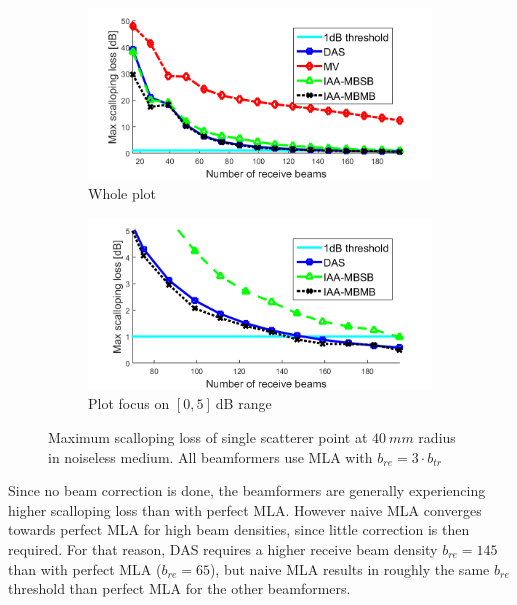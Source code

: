 \begin{figure}[ht]
    \centering
    \begin{subfigure}[t]{\linewidth}
        \includegraphics[width=\linewidth]{./images/results/4/loss_vs_beams_mla.png}
        \caption{Whole plot}
    \end{subfigure}
    \quad
    \begin{subfigure}[t]{\linewidth}
        \includegraphics[width=\linewidth]{./images/results/4/loss_vs_beams_mla_zoom.png}
        \caption{Plot focus on $[0, 5]~$dB range}
    \end{subfigure}
	\caption{Maximum scalloping loss of single scatterer point at $40~mm$ radius in noiseless medium. All beamformers use MLA with $b_{re} = 3 \cdot b_{tr}$}
	\label{fig:loss_vs_beams_mla}
\end{figure}

Since no beam correction is done, the beamformers are generally experiencing higher scalloping loss than with perfect MLA. However naive MLA converges towards perfect MLA for high beam densities, since little correction is then required.
For that reason, DAS requires a higher receive beam density $b_{re} = 145$ than with perfect MLA ($b_{re} = 65$), but naive MLA results in roughly the same $b_{re}$ threshold than perfect MLA for the other beamformers.

